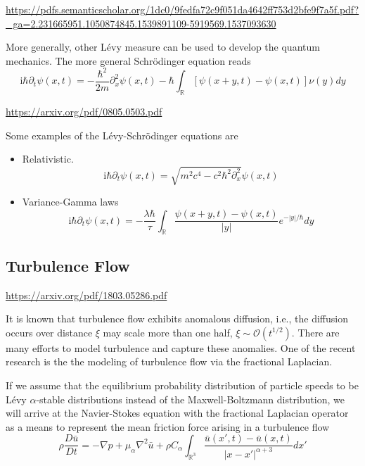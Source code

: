 \documentclass[10pt,a4paper]{article}
\newcommand{\ii}[0]{\mathrm{i}}
\newcommand{\RR}[0]{\mathbb{R}}
\theoremstyle{definition}
\begin{document}
\url{https://pdfs.semanticscholar.org/1dc0/9fedfa72c9f051da4642ff753d2bfe9f7a5f.pdf?_ga=2.231665951.1050874845.1539891109-5919569.1537093630}

More generally, other L\'evy measure can be used to develop the quantum mechanics. The more general Schr\"odinger equation reads
\begin{equation}
	\ii \hbar\partial_t \psi(x,t) = -\frac{\hbar^2}{2m}\partial_x^2 \psi(x,t) - \hbar  \int_\RR [\psi(x+y,t)-\psi(x,t)]\nu(y)dy
\end{equation}

\url{https://arxiv.org/pdf/0805.0503.pdf}

Some examples of the L\'evy-Schr\"odinger equations are
\begin{itemize}
	\item Relativistic.
	\begin{equation}
		\ii \hbar\partial_t \psi(x,t) = \sqrt{m^2c^4-c^2\hbar^2\partial_x^2} \psi(x,t)
	\end{equation}
	\item Variance-Gamma laws
	\begin{equation}
		\ii \hbar\partial_t \psi(x,t) = -\frac{\lambda\hbar}{\tau}\int_\RR\frac{\psi(x+y,t)-\psi(x,t)}{|y|}e^{-|y|/\hbar}dy
	\end{equation}

\end{itemize}

\subsection{Turbulence Flow}

\url{https://arxiv.org/pdf/1803.05286.pdf}

It is known that turbulence flow exhibits anomalous diffusion, i.e., the diffusion occurs over distance $\xi$ may scale more than one half, $\xi\sim\mathcal{O}(t^{1/2})$. There are many efforts to model turbulence and capture these anomalies. One of the recent research is the the modeling of turbulence flow via the fractional Laplacian. 

If we assume that the equilibrium probability distribution of particle speeds to be L\'evy $\alpha$-stable distributions instead of the Maxwell-Boltzmann distribution, we will arrive at the Navier-Stokes equation with the fractional Laplacian operator as a means to represent the mean friction force arising in a turbulence flow
\begin{equation}
	\rho\frac{D\bar u}{Dt} = -\nabla p + \mu_\alpha \nabla^2 \bar u + \rho C_\alpha \int_{\RR^3} \frac{\bar u(x',t)-\bar u(x,t)}{|x-x'|^{\alpha+3}} dx'
\end{equation}
\end{document}

